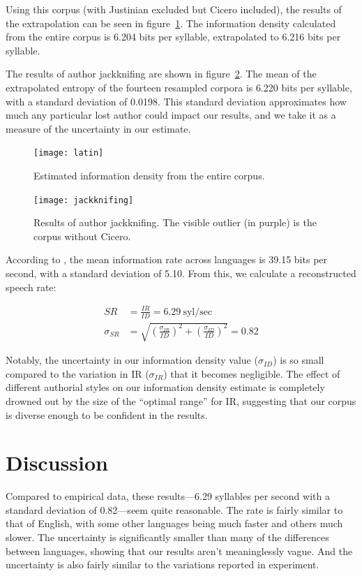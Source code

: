\documentclass[12pt,twoside]{article}
\begin{document}
Using this corpus (with Justinian excluded but Cicero included), the results of the extrapolation can be seen in figure~\ref{fig:results}. The information density calculated from the entire corpus is 6.204 bits per syllable, extrapolated to 6.216 bits per syllable.

The results of author jackknifing are shown in figure~\ref{fig:jackknifing}. The mean of the extrapolated entropy of the fourteen resampled corpora is 6.220 bits per syllable, with a standard deviation of 0.0198. This standard deviation approximates how much any particular lost author could impact our results, and we take it as a measure of the uncertainty in our estimate.

\begin{figure}[h]
\centering
\noindent\texttt{[image: latin]}
\caption{Estimated information density from the entire corpus.}
\label{fig:results}
\end{figure}

\begin{figure}[h]
\centering
\noindent\texttt{[image: jackknifing]}
\caption{Results of author jackknifing. The visible outlier (in purple) is the corpus without Cicero.}
\label{fig:jackknifing}
\end{figure}

According to \citet{coupé}, the mean information rate across languages is 39.15 bits per second, with a standard deviation of 5.10. From this, we calculate a reconstructed speech rate:

\begin{align}
SR &= \frac{IR}{ID} = 6.29\:\textrm{syl/sec} \\
\sigma_{SR} &= \sqrt{\left(\frac{\sigma_{IR}}{ID}\right)^2 + \left(\frac{\sigma_{ID}}{ID}\right)^2} = 0.82
\end{align}

Notably, the uncertainty in our information density value (\(\sigma_{ID}\)) is so small compared to the variation in IR (\(\sigma_{IR}\)) that it becomes negligible. The effect of different authorial styles on our information density estimate is completely drowned out by the size of the ``optimal range'' for IR, suggesting that our corpus is diverse enough to be confident in the results.

\section{Discussion}
\label{sec:disc}

Compared to  empirical data, these results---6.29 syllables per second with a standard deviation of 0.82---seem quite reasonable. The rate is fairly similar to that of English, with some other languages being much faster and others much slower. The uncertainty is significantly smaller than many of the differences between languages, showing that our results aren't meaninglessly vague. And the uncertainty is also fairly similar to the variations reported in  experiment.
\end{document}

